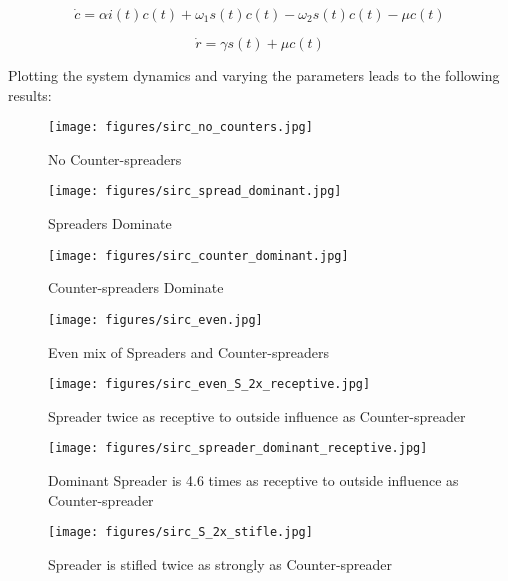 \begin{equation}\label{eqn:C_dynamics}
\dot{c} = \alpha i(t)c(t) + \omega_1 s(t)c(t) - \omega_2 s(t)c(t) - \mu c(t)
\end{equation}

\begin{equation}\label{eqn:R_dynamics}
\dot{r} = \gamma s(t) + \mu c(t)
\end{equation}

\noindent Plotting the system dynamics and varying the parameters leads to the following results:

\begin{figure}[!htbp]
  \texttt{[image: figures/sirc\_no\_counters.jpg]}
  \caption{No Counter-spreaders}
  \label{fig:sirc_no_counters}
\end{figure}

\begin{figure}[!htbp]
  \texttt{[image: figures/sirc\_spread\_dominant.jpg]}
  \caption{Spreaders Dominate}
  \label{fig:sirc_spread_dominant}
\end{figure}

\begin{figure}[!htbp]
  \texttt{[image: figures/sirc\_counter\_dominant.jpg]}
  \caption{Counter-spreaders Dominate}
  \label{fig:sirc_counter_dominant}
\end{figure}

\begin{figure}[!htbp]
  \texttt{[image: figures/sirc\_even.jpg]}
  \caption{Even mix of Spreaders and Counter-spreaders}
  \label{fig:sirc_even}
\end{figure}

\begin{figure}[!htbp]
  \texttt{[image: figures/sirc\_even\_S\_2x\_receptive.jpg]}
  \caption{Spreader twice as receptive to outside influence as Counter-spreader}
  \label{fig:sirc_even_S_2x_receptive}
\end{figure}

\begin{figure}[!htbp]
  \texttt{[image: figures/sirc\_spreader\_dominant\_receptive.jpg]}
  \caption{Dominant Spreader is 4.6 times as receptive to outside influence as Counter-spreader}
  \label{fig:sirc_spreader_dominant_receptive}
\end{figure}

\begin{figure}[!htbp]
  \texttt{[image: figures/sirc\_S\_2x\_stifle.jpg]}
  \caption{Spreader is stifled twice as strongly as Counter-spreader}
  \label{fig:sirc_S_2x_stifle}
\end{figure}


